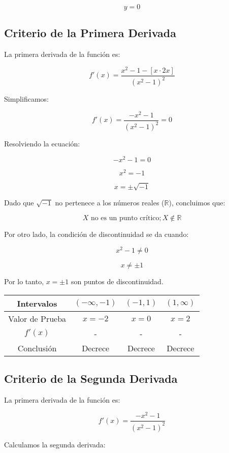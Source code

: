 \[
y = 0
\]


\subsection*{Criterio de la Primera Derivada}

La primera derivada de la función es:

\[
f'(x) = \frac{x^2 - 1 - \left[x \cdot 2x\right]}{(x^2 - 1)^2}
\]

Simplificamos:

\[
f'(x) = \frac{-x^2 - 1}{(x^2 - 1)^2} = 0
\]

Resolviendo la ecuación:

\[
-x^2 - 1 = 0
\]

\[
x^2 = -1
\]

\[
x = \pm \sqrt{-1}
\]

Dado que $\sqrt{-1}$ no pertenece a los números reales ($\mathbb{R}$), concluimos que:

\[
X \text{ no es un punto crítico}; X \notin \mathbb{R}
\]

Por otro lado, la condición de discontinuidad se da cuando:

\[
x^2 - 1 \neq 0
\]

\[
x \neq \pm 1
\]

Por lo tanto, $x = \pm 1$ son puntos de discontinuidad.

\begin{center}
    \begin{tabular}{|c|c|c|c|}
        \hline
        Intervalos & $(-\infty,-1)$ & $(-1,1)$ & $(1,\infty)$ \\
        \hline
        Valor de Prueba & $x=-2$ & $x=0$ & $x=2$ \\
        \hline
        $f'(x)$ & - & - & - \\
        \hline
        Conclusión & Decrece & Decrece & Decrece \\
        \hline
    \end{tabular}
\end{center}


\subsection*{Criterio de la Segunda Derivada}

La primera derivada de la función es:

\[
f'(x) = \frac{-x^2 -1}{(x^2 - 1)^2}
\]

Calculamos la segunda derivada:

